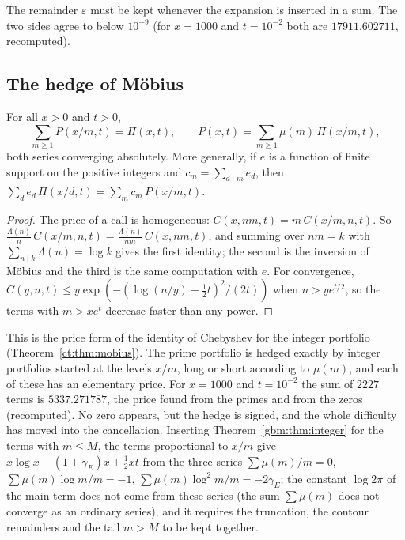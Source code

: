 The remainder $\varepsilon$ must be kept whenever the expansion is inserted in a sum. The two sides agree to below $10^{-9}$ (for $x=1000$ and $t=10^{-2}$ both are $17911.602711$, recomputed).

\subsection{The hedge of M\"obius}

\begin{theorem}\label{gbm:thm:moebius}
For all $x>0$ and $t>0$,
\[
\sum_{m\ge1}P(x/m,t)=\Pi(x,t),\qquad P(x,t)=\sum_{m\ge1}\mu(m)\,\Pi(x/m,t),
\]
both series converging absolutely. More generally, if $e$ is a function of finite support on the positive integers and $c_m=\sum_{d\mid m}e_d$, then $\sum_de_d\,\Pi(x/d,t)=\sum_mc_m\,P(x/m,t)$.
\end{theorem}

\begin{proof}
The price of a call is homogeneous: $C(x,nm,t)=m\,C(x/m,n,t)$. So $\frac{\Lambda(n)}n\,C(x/m,n,t)=\frac{\Lambda(n)}{nm}\,C(x,nm,t)$, and summing over $nm=k$ with $\sum_{n\mid k}\Lambda(n)=\log k$ gives the first identity; the second is the inversion of M\"obius and the third is the same computation with $e$. For convergence, $C(y,n,t)\le y\exp(-(\log(n/y)-\frac12t)^2/(2t))$ when $n>ye^{t/2}$, so the terms with $m>xe^{t}$ decrease faster than any power.
\end{proof}

This is the price form of the identity of Chebyshev for the integer portfolio (Theorem~\ref{ct:thm:mobius}). The prime portfolio is hedged exactly by integer portfolios started at the levels $x/m$, long or short according to $\mu(m)$, and each of these has an elementary price. For $x=1000$ and $t=10^{-2}$ the sum of $2227$ terms is $5337.271787$, the price found from the primes and from the zeros (recomputed). No zero appears, but the hedge is signed, and the whole difficulty has moved into the cancellation. Inserting Theorem~\ref{gbm:thm:integer} for the terms with $m\le M$, the terms proportional to $x/m$ give $x\log x-(1+\gamma_E)x+\frac12xt$ from the three series $\sum\mu(m)/m=0$, $\sum\mu(m)\log m/m=-1$, $\sum\mu(m)\log^2m/m=-2\gamma_E$; the constant $\log2\pi$ of the main term does not come from these series (the sum $\sum\mu(m)$ does not converge as an ordinary series), and it requires the truncation, the contour remainders and the tail $m>M$ to be kept together.

